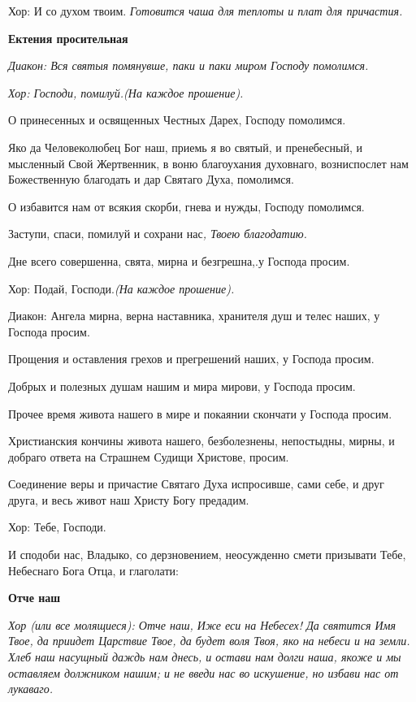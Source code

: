   Хор:\normalfont{} И со духом твоим. \itshape  Готовится чаша для теплоты и плат для причастия\normalfont{}. 


\medskip\bfseries  Ектения просительная \normalfont{}\nopagebreak


\itshape  Диакон:\normalfont{} Вся святыя помянувше, паки и паки миром Господу помолимся. 


\itshape Хор:\normalfont{} Господи, помилуй.\itshape  (На каждое прошение)\normalfont{}. 


  О принесенных и освященных Честных Дарех, Господу помолимся. 


  Яко да Человеколюбец Бог наш, приемь я во святый, и пренебесный, и мысленный Свой Жертвенник, в воню благоухания духовнаго, возниспослет нам Божественную благодать и дар Святаго Духа, помолимся. 


  О избавится нам от всякия скорби, гнева и нужды, Господу помолимся. 


  Заступи, спаси, помилуй и сохрани нас\itshape ,\normalfont{} Твоею благодатию. 


  Дне всего совершенна, свята, мирна и безгрешна,.у Господа просим. \itshape 


  Хор:\normalfont{} Подай, Господи.\itshape  (На каждое прошение)\normalfont{}. \itshape 


  Диакон:\normalfont{} Ангела мирна, верна наставника, хранителя душ и телес наших, у Господа просим. 


  Прощения и оставления грехов и прегрешений наших, у Господа просим. 


  Добрых и полезных душам нашим и мира мирови, у Господа просим. 


  Прочее время живота нашего в мире и покаянии скончати у Господа просим. 


  Христианския кончины живота нашего, безболезнены, непостыдны, мирны, и добраго ответа на Страшнем Судищи Христове, просим. 


  Соединение веры и причастие Святаго Духа испросивше, сами себе, и друг друга, и весь живот наш Христу Богу предадим. \itshape 


  Хор:\normalfont{} Тебе, Господи. 


  И сподоби нас, Владыко, со дерзновением, неосужденно смети призывати Тебе, Небеснаго Бога Отца, и глаголати: 


\medskip\bfseries  Отче наш \normalfont{}\nopagebreak


\itshape  Хор (или все молящиеся):\normalfont{} Отче наш, Иже еси на Небесех! Да святится Имя Твое, да приидет Царствие Твое, да будет воля Твоя, яко на небеси и на земли. Хлеб наш насущный даждь нам днесь, и остави нам долги наша, якоже и мы оставляем должником нашим; и не введи нас во искушение, но избави нас от лукаваго. 


